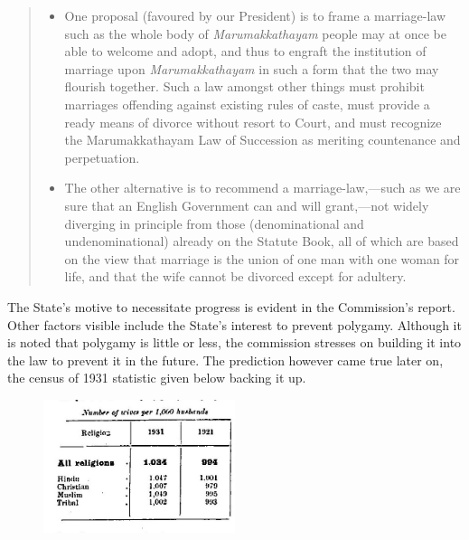 \documentclass[a4paper]{article}
\begin{document}
\blockquote[{\cite[65]{menon1894report}}]{
    \begin{itemize}
        \item One proposal (favoured by our
            President) is to frame a marriage-law
            such as the whole body of
            \emph{Marumakkathayam} people may at
            once be able to welcome and adopt, and
            thus to engraft the institution of
            marriage upon \emph{Marumakkathayam} in such
            a form that the two may flourish
            together.  Such a law amongst other
            things must prohibit marriages
            offending against existing rules of
            caste, must provide a ready means of
            divorce without resort to Court, and
            must recognize the Marumakkathayam Law
            of Succession as meriting countenance
            and perpetuation.  
        \item The other alternative is to recommend
            a marriage-law,—such as we are sure
            that an English Government can and
            will grant,—not widely diverging in
            principle from those (denominational
            and undenominational) already on the
            Statute Book, all of which are based
            on the view that marriage is the union
            of one man with one woman for life,
            and that the wife cannot be divorced
            except for adultery.
    \end{itemize} 
}

The State's motive to necessitate progress is
evident in the Commission's
report\cite[61]{menon1894report}. Other factors
visible include the State's interest to prevent
polygamy. Although it is noted that polygamy is
little or less, the commission stresses on
building it into the law to prevent it in the
future. The prediction however came true later on,
the census of 1931 statistic given below backing
it up.

\begin{figure}[!ht]
\begin{center}
    \includegraphics[width=0.5\textwidth]{wives_husbands_statistic}
\end{center}
\end{figure}
\end{document}
